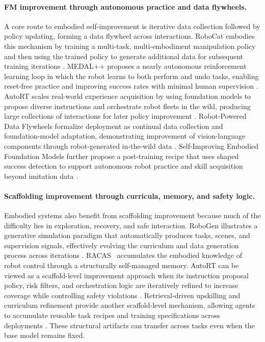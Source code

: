 \paragraph{FM improvement through autonomous practice and data flywheels.}
A core route to embodied self-improvement is iterative data collection followed by policy updating, forming a data flywheel across interactions. RoboCat embodies this mechanism by training a multi-task, multi-embodiment manipulation policy and then using the trained policy to generate additional data for subsequent training iterations \citep{bousmalis2023robocatselfimprovinggeneralistagent}. MEDAL++ proposes a nearly autonomous reinforcement learning loop in which the robot learns to both perform and undo tasks, enabling reset-free practice and improving success rates with minimal human supervision \citep{sharma2023selfimprovingrobotsendtoendautonomous}. AutoRT scales real-world experience acquisition by using foundation models to propose diverse instructions and orchestrate robot fleets in the wild, producing large collections of interactions for later policy improvement \citep{ahn2024autortembodiedfoundationmodels}. Robot-Powered Data Flywheels formalize deployment as continual data collection and foundation-model adaptation, demonstrating improvement of vision-language components through robot-generated in-the-wild data \citep{grannen2025robotpowereddataflywheelsdeploying}. Self-Improving Embodied Foundation Models further propose a post-training recipe that uses shaped success detection to support autonomous robot practice and skill acquisition beyond imitation data \citep{ghasemipour2025selfimproving}.

\paragraph{Scaffolding improvement through curricula, memory, and safety logic.}
Embodied systems also benefit from scaffolding improvement because much of the difficulty lies in exploration, recovery, and safe interaction. RoboGen illustrates a generative simulation paradigm that automatically produces tasks, scenes, and supervision signals, effectively evolving the curriculum and data generation process across iterations \citep{wang2024robogenunleashinginfinitedata}. RACAS~\citep{ashley2026racas} accumulates the embodied knowledge of robot control through a structurally self-managed memory.
AutoRT can be viewed as a scaffold-level improvement approach when its instruction proposal policy, risk filters, and orchestration logic are iteratively refined to increase coverage while controlling safety violations \citep{ahn2024autortembodiedfoundationmodels}. Retrieval-driven upskilling and curriculum refinement provide another scaffold-level mechanism, allowing agents to accumulate reusable task recipes and training specifications across deployments \citep{zhu2025auraautonomousupskillingretrievalaugmented}. These structural artifacts can transfer across tasks even when the base model remains fixed.

